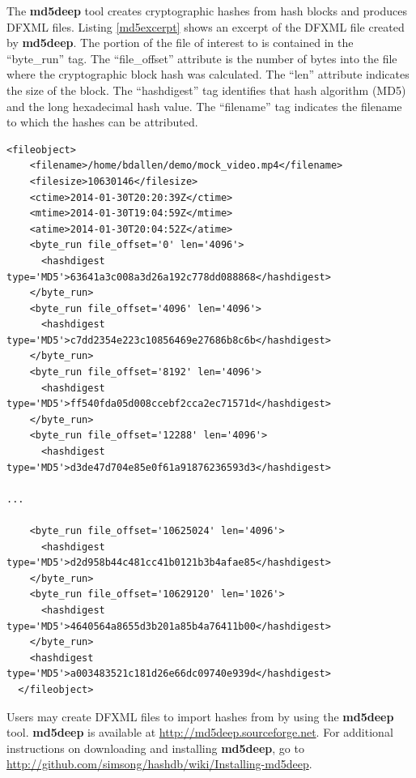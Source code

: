 \documentclass[11pt,fleqn]{article} %
\begin{document}
The \textbf{md5deep} tool creates cryptographic hashes from hash blocks and produces DFXML files. Listing \ref{md5excerpt} shows an excerpt of the DFXML file created by \textbf{md5deep}. The portion of the file of interest to \hash is contained in the ``byte\_run'' tag. The ``file\_offset'' attribute is the number of bytes into the file where the cryptographic block hash was calculated. The  ``len'' attribute indicates the size of the block.  The ``hashdigest'' tag identifies that hash algorithm (MD5) and the long hexadecimal hash value. The ``filename'' tag indicates the filename to which the hashes can be attributed. \\
\lstset{style=customfile}
\begin{lstlisting}[float, caption=Excerpt of a DFXML report file showing the MD5 output, label=md5excerpt]
  <fileobject>
    <filename>/home/bdallen/demo/mock_video.mp4</filename>
    <filesize>10630146</filesize>
    <ctime>2014-01-30T20:20:39Z</ctime>
    <mtime>2014-01-30T19:04:59Z</mtime>
    <atime>2014-01-30T20:04:52Z</atime>
    <byte_run file_offset='0' len='4096'>   
      <hashdigest type='MD5'>63641a3c008a3d26a192c778dd088868</hashdigest>
    </byte_run>
    <byte_run file_offset='4096' len='4096'>   
      <hashdigest type='MD5'>c7dd2354e223c10856469e27686b8c6b</hashdigest>
    </byte_run>
    <byte_run file_offset='8192' len='4096'>   
      <hashdigest type='MD5'>ff540fda05d008ccebf2cca2ec71571d</hashdigest>
    </byte_run>
    <byte_run file_offset='12288' len='4096'>   
      <hashdigest type='MD5'>d3de47d704e85e0f61a91876236593d3</hashdigest>

...

    <byte_run file_offset='10625024' len='4096'>   
      <hashdigest type='MD5'>d2d958b44c481cc41b0121b3b4afae85</hashdigest>
    </byte_run>
    <byte_run file_offset='10629120' len='1026'>   
      <hashdigest type='MD5'>4640564a8655d3b201a85b4a76411b00</hashdigest>
    </byte_run>
    <hashdigest type='MD5'>a003483521c181d26e66dc09740e939d</hashdigest>
  </fileobject>

\end{lstlisting}  

Users may create DFXML files to import hashes from by using the
\textbf{md5deep} tool.
\textbf{md5deep} is available at \url{http://md5deep.sourceforge.net}.
For additional instructions on downloading and installing
\textbf{md5deep}, go to \url{http://github.com/simsong/hashdb/wiki/Installing-md5deep}.\\
\end{document}
